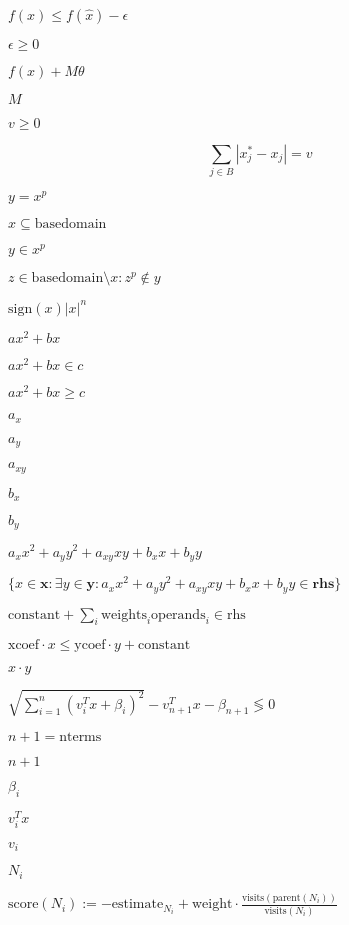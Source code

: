 \documentclass{article}
\begin{document}
$f(x) \le f(\hat{x}) - \epsilon$
\pagebreak

$\epsilon \ge 0$
\pagebreak

$f(x) + M\theta$
\pagebreak

$M$
\pagebreak

$v \geq 0$
\pagebreak

\[
  \sum\limits_{j\in B} |x_j^* - x_j| = v
\]
\pagebreak

$y = x^p$
\pagebreak

$x \subseteq \text{basedomain}$
\pagebreak

$y \in x^p$
\pagebreak

$z \in \text{basedomain} \setminus x: z^p \not \in y$
\pagebreak

$\mathrm{sign}(x) |x|^n$
\pagebreak

$ a x^2 + b x $
\pagebreak

$ a x^2 + b x \in c$
\pagebreak

$ a x^2 + b x \geq c$
\pagebreak

$a_x$
\pagebreak

$a_y$
\pagebreak

$a_{xy}$
\pagebreak

$b_x$
\pagebreak

$b_y$
\pagebreak

$ a_x x^2 + a_y y^2 + a_{xy} x y + b_x x + b_y y $
\pagebreak

$ \{ x \in \mathbf{x} : \exists y \in \mathbf{y} : a_x x^2 + a_y y^2 + a_{xy} x y + b_x x + b_y y \in \mathbf{\mbox{rhs}} \} $
\pagebreak

$\text{constant} + \sum_i \text{weights}_i \text{operands}_i \in \text{rhs}$
\pagebreak

$\text{xcoef}\cdot x \leq \text{ycoef} \cdot y + \text{constant}$
\pagebreak

$x\cdot y$
\pagebreak

$\sqrt{\sum_{i=1}^{n} (v_i^T x + \beta_i)^2} - v_{n+1}^T x - \beta_{n+1} \lessgtr 0$
\pagebreak

$n+1 = \text{nterms}$
\pagebreak

$n+1$
\pagebreak

$\beta_i$
\pagebreak

$v_i^T x$
\pagebreak

$v_i$
\pagebreak

$N_i$
\pagebreak

$ \mbox{score}(N_i) := -\mbox{estimate}_{N_i} + \mbox{weight} \cdot \frac{\mbox{visits}(\mbox{parent}(N_i))}{\mbox{visits}(N_i)}
$
\pagebreak
\end{document}
